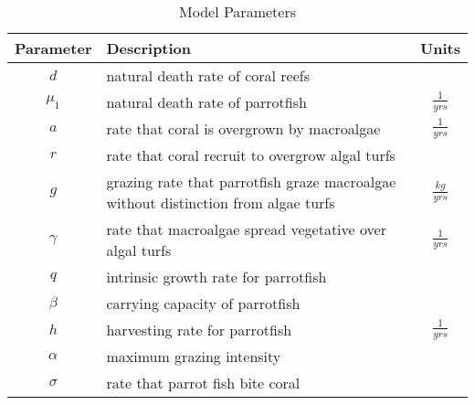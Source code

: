 \documentclass[12pt]{article}
\begin{document}
\begin{table}[H]
    \centering
    \begin{tabular}{c p{9cm} c}
        \hline
        Parameter & Description & Units  \\
        \hline
        \hline
        $d$ & natural death rate of coral reefs & \\
        $\mu_{1}$ & natural death rate of parrotfish & $\frac{1}{yrs}$\cite{12_noaa_report}\\
        $a$ & rate that coral is overgrown by macroalgae & $\frac{1}{yrs}$\\
        $r$ & rate that coral recruit to overgrow algal turfs & \\
        $g$ & grazing rate that parrotfish graze macroalgae without distinction from algae turfs & $\frac{kg}{yrs}$\\
        $\gamma$ & rate that macroalgae spread vegetative over algal turfs & $\frac{1}{yrs}$\\
        $q$ & intrinsic growth rate for parrotfish & \\
        $\beta$ & carrying capacity of parrotfish & \\
        $h$ & harvesting rate for parrotfish & $\frac{1}{yrs}$\cite{12_noaa_report}\\
        $\alpha$ & maximum grazing intensity & \\
        $\sigma$ & rate that parrot fish bite coral & \\
        \hline
    \end{tabular}
    \caption{Model Parameters}
    \label{tab:my_label}
\end{table}


\end{document}
